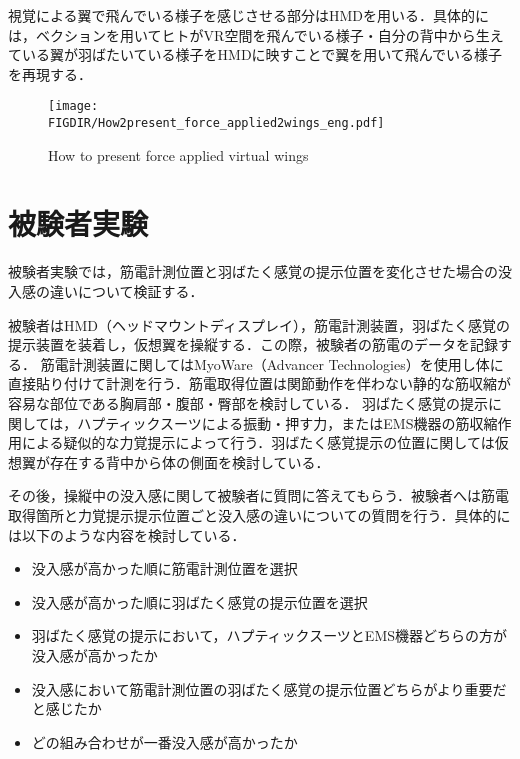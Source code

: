 \begin{small}
    視覚による翼で飛んでいる様子を感じさせる部分はHMDを用いる．具体的には，ベクションを用いてヒトがVR空間を飛んでいる様子・自分の背中から生えている翼が羽ばたいている様子をHMDに映すことで翼を用いて飛んでいる様子を再現する．

    \begin{figure}[b]
      \begin{center}
        \texttt{[image: \\FIGDIR/How2present\_force\_applied2wings\_eng.pdf]}%
        \caption{How to present force applied virtual wings}
      \end{center}
    \end{figure}



\section{被験者実験}
  被験者実験では，筋電計測位置と羽ばたく感覚の提示位置を変化させた場合の没入感の違いについて検証する．
    
  被験者はHMD（ヘッドマウントディスプレイ），筋電計測装置，羽ばたく感覚の提示装置を装着し，仮想翼を操縦する．この際，被験者の筋電のデータを記録する．
  筋電計測装置に関してはMyoWare（Advancer Technologies）を使用し体に直接貼り付けて計測を行う．筋電取得位置は関節動作を伴わない静的な筋収縮が容易な部位である胸肩部・腹部・臀部を検討している．
  羽ばたく感覚の提示に関しては，ハプティックスーツによる振動・押す力，またはEMS機器の筋収縮作用による疑似的な力覚提示によって行う．羽ばたく感覚提示の位置に関しては仮想翼が存在する背中から体の側面を検討している．
  
  その後，操縦中の没入感に関して被験者に質問に答えてもらう．被験者へは筋電取得箇所と力覚提示提示位置ごと没入感の違いについての質問を行う．具体的には以下のような内容を検討している．
  \begin{itemize}
    \item 没入感が高かった順に筋電計測位置を選択 %
    \item 没入感が高かった順に羽ばたく感覚の提示位置を選択
    \item 羽ばたく感覚の提示において，ハプティックスーツとEMS機器どちらの方が没入感が高かったか
    \item 没入感において筋電計測位置の羽ばたく感覚の提示位置どちらがより重要だと感じたか
    \item どの組み合わせが一番没入感が高かったか
  \end{itemize}
    


\end{small}
